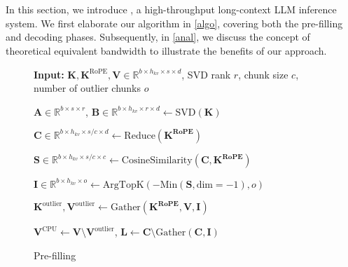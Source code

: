 \section{\Sys}
\label{sec:shadowkv}
In this section, we introduce \Sys, a high-throughput long-context LLM inference system. We first elaborate our algorithm in \cref{algo}, covering both the pre-filling and decoding phases. Subsequently, in \cref{anal}, we discuss the concept of theoretical equivalent bandwidth to illustrate the benefits of our approach.

\begin{figure}[t]
\begin{minipage}{0.57\linewidth}
\vspace{3pt}
\begin{algorithm}[H]
\caption{\Sys Pre-filling}
\label{alg:prefill}
\begin{algorithmic}
\State \textbf{Input:} $\boldsymbol{K},\boldsymbol{K}^{\text{RoPE}}, \boldsymbol{V} \in \mathbb{R}^{b\times h_{kv} \times s\times d}$, SVD rank $r$, chunk size $c$, number of outlier chunks $o$

\State $\boldsymbol{A} \in \mathbb{R}^{b\times s \times r}$, $\boldsymbol{B} \in \mathbb{R}^{b \times h_{kv} \times r \times d} \leftarrow \text{SVD}(\boldsymbol{K})$

\State $\boldsymbol{C} \in \mathbb{R}^{b\times h_{kv} \times s/c \times d} \leftarrow \text{Reduce}(\boldsymbol{K^{\text{RoPE}}})$

\State $\boldsymbol{S} \in \mathbb{R}^{b\times h_{kv} \times s/c \times c} \leftarrow \text{CosineSimilarity}(\boldsymbol{C}, \boldsymbol{K^{\text{RoPE}}})$

\State $\boldsymbol{I}\in \mathbb{R}^{b\times h_{kv} \times o} \leftarrow \text{ArgTopK}(-\text{Min}(\boldsymbol{S}, \text{dim}=-1), o)$

\State $\boldsymbol{K}^{\text{outlier}}, \boldsymbol{V}^{\text{outlier}} \leftarrow \text{Gather} (\boldsymbol{K^{\text{RoPE}}}, \boldsymbol{V}, \boldsymbol{I})$

\State $\boldsymbol{V}^{\text{CPU}} \leftarrow \boldsymbol{V} \setminus \boldsymbol{V}^{\text{outlier}}$, $\boldsymbol{L} \leftarrow \boldsymbol{C} \setminus \text{Gather} (\boldsymbol{C}, \boldsymbol{I})$ 


\end{algorithmic}
\end{algorithm}
\end{minipage}
\end{figure}
